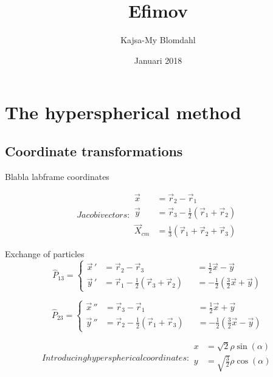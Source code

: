 \documentclass{article}
\title{Efimov}
\author{Kajsa-My Blomdahl}
\date{Januari 2018}
\begin{document}
\maketitle

\section{The hyperspherical method}

\subsection{Coordinate transformations}

Blabla labframe coordinates

\begin{subequations}
Jacobi vectors:
\begin{align}
        \vec{x} 		&= \vec{r}_2 - \vec{r}_1\\
        \vec{y} 		&= \vec{r}_3 - \frac{1}{2}(\vec{r}_1 + \vec{r}_2)\\
        \vec{X}_{cm} 	&= \frac{1}{3} (\vec{r}_1 + \vec{r}_2 + \vec{r}_3)
\end{align}
\end{subequations}

Exchange of particles
\begin{equation}
\hat{P}_{13} = \left \{ \begin{aligned}
        \vec{x} \, ' &= \vec{r}_2 - \vec{r}_3 &&= \frac{1}{2}\vec{x} - \vec{y} \\
        \vec{y} \, ' &= \vec{r}_1 - \frac{1}{2}(\vec{r}_3 + \vec{r}_2) &&= -\frac{1}{2} (\frac{3}{2} \vec{x} + \vec{y})
       \end{aligned}
 \right.
 \end{equation}
 
\begin{equation}
\hat{P}_{23} = \left \{ \begin{aligned}
        \vec{x} \, '' &= \vec{r}_3 - \vec{r}_1 &&= \frac{1}{2}\vec{x} + \vec{y} \\
        \vec{y} \, '' &= \vec{r}_2 - \frac{1}{2}(\vec{r}_1 + \vec{r}_3) &&= -\frac{1}{2} (\frac{3}{2} \vec{x} - \vec{y})
       \end{aligned}
 \right.
 \end{equation}

\begin{subequations}
Introducing hyperspherical coordinates:
\begin{align}
        x &= \sqrt{2} \rho \sin(\alpha)\\
        y &= \sqrt{\frac{3}{2}} \rho \cos(\alpha)\\
\end{align}
\end{subequations}
\end{document}

